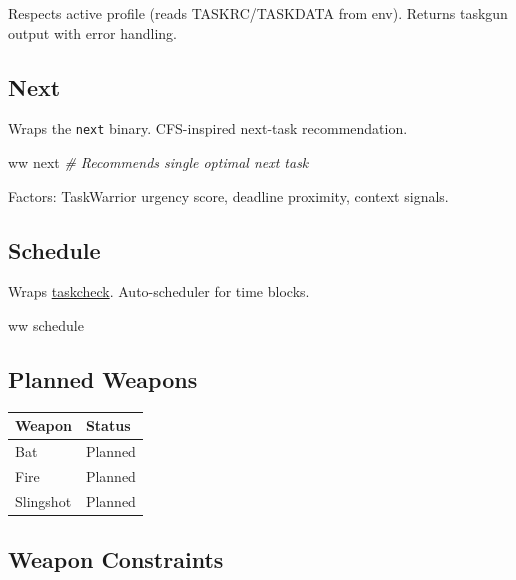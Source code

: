 \documentclass[
]{article}
\newenvironment{Shaded}{\begin{snugshade}}{\end{snugshade}}
\newcommand{\CommentTok}[1]{\textcolor[rgb]{0.56,0.35,0.01}{\textit{#1}}}
\newcommand{\ExtensionTok}[1]{#1}
\newcommand{\NormalTok}[1]{#1}
\newcounter{none} %
\begin{document}
Respects active profile (reads TASKRC/TASKDATA from env). Returns
taskgun output with error handling.

\subsection{Next}\label{next}

Wraps the \texttt{next} binary. CFS-inspired next-task recommendation.

\begin{Shaded}
\begin{Highlighting}[]
\ExtensionTok{ww}\NormalTok{ next         }\CommentTok{\# Recommends single optimal next task}
\end{Highlighting}
\end{Shaded}

Factors: TaskWarrior urgency score, deadline proximity, context signals.

\subsection{Schedule}\label{schedule}

Wraps \href{https://github.com/taskcheck/taskcheck}{taskcheck}.
Auto-scheduler for time blocks.

\begin{Shaded}
\begin{Highlighting}[]
\ExtensionTok{ww}\NormalTok{ schedule}
\end{Highlighting}
\end{Shaded}

\subsection{Planned Weapons}\label{planned-weapons}

{\def\LTcaptype{none} %
\begin{longtable}[]{@{}ll@{}}
\toprule\noalign{}
Weapon & Status \\
\midrule\noalign{}
\endhead
\bottomrule\noalign{}
\endlastfoot
Bat & Planned \\
Fire & Planned \\
Slingshot & Planned \\
\end{longtable}
}

\subsection{Weapon Constraints}\label{weapon-constraints}
\end{document}
